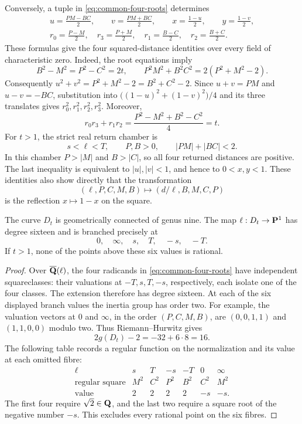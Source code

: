 Conversely, a tuple in \eqref{eq:common-four-roots} determines
\begin{equation}\label{eq:common-return}
\begin{gathered}
 u=\frac{PM-BC}{2},\qquad v=\frac{PM+BC}{2},\qquad
 x=\frac{1-u}{2},\qquad y=\frac{1-v}{2},\\
 r_0=\frac{P-M}{2},\quad r_3=\frac{P+M}{2},\quad
 r_1=\frac{B-C}{2},\quad r_2=\frac{B+C}{2}.
\end{gathered}
\end{equation}
These formulas give the four squared-distance identities over every field
of characteristic zero.  Indeed, the root equations imply
\[
 B^2-M^2=P^2-C^2=2t,\qquad
 P^2M^2+B^2C^2=2(P^2+M^2-2).
\]
Consequently $u^2+v^2=P^2+M^2-2=B^2+C^2-2$.  Since
$u+v=PM$ and $u-v=-BC$, substitution into
$\bigl((1-u)^2+(1-v)^2\bigr)/4$ and its three translates gives
$r_0^2,r_1^2,r_2^2,r_3^2$.  Moreover,
\[
 r_0r_3+r_1r_2=\frac{P^2-M^2+B^2-C^2}{4}=t.
\]
For $t>1$, the strict real return chamber is
\begin{equation}\label{eq:common-chamber}
 s<\ell<T,\qquad P,B>0,\qquad |PM|+|BC|<2.
\end{equation}
In this chamber $P>|M|$ and $B>|C|$, so all four returned distances are
positive.  The last inequality is equivalent to $|u|,|v|<1$, and hence to
$0<x,y<1$.  These identities also show directly that the transformation
\begin{equation}\label{eq:common-reflection}
 (\ell,P,C,M,B)\longmapsto(d/\ell,B,M,C,P)
\end{equation}
is the reflection $x\mapsto1-x$ on the square.

\begin{proposition}\label{prop:common-genus-boundary}
The curve $D_t$ is geometrically connected of genus nine.  The map
$\ell:D_t\to\mathbf P^1$ has degree sixteen and is branched precisely at
\[
 0,\quad\infty,\quad s,\quad T,\quad-s,\quad-T.
\]
If $t>1$, none of the points above these six values is rational.
\end{proposition}
\begin{proof}
Over $\overline{\mathbf Q}(\ell)$, the four radicands in
\eqref{eq:common-four-roots} have independent squareclasses: their
valuations at $-T,s,T,-s$, respectively, each isolate one of the four
classes.  The extension therefore has degree sixteen.  At each of the
six displayed branch values the inertia group has order two.  For
example, the valuation vectors at $0$ and $\infty$, in the order
$(P,C,M,B)$, are $(0,0,1,1)$ and $(1,1,0,0)$ modulo two.  Thus
Riemann--Hurwitz gives
\[
 2g(D_t)-2=-32+6\cdot8=16.
\]
The following table records a regular function on the normalization and
its value at each omitted fibre:
\[
\begin{array}{c|rrrrrr}
 \ell&s&T&-s&-T&0&\infty\\\hline
 \text{regular square}&M^2&C^2&P^2&B^2&C^2&M^2\\
 \text{value}&2&2&2&2&-s&-s.
\end{array}
\]
The first four require $\sqrt2\in\mathbf Q$, and the last two require a square
root of the negative number $-s$.  This excludes every rational point
on the six fibres.
\end{proof}

